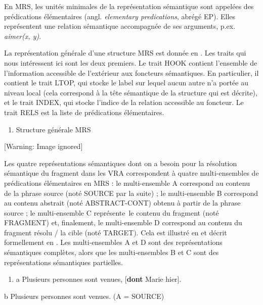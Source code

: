 En MRS, les unités minimales de la représentation sémantique sont appelées des prédications élémentaires (angl. \textit{elementary predications}, abrégé EP). Elles représentent une relation sémantique accompagnée de ses arguments, p.ex. \textit{aimer(x, y)}. 

La représentation générale d'une structure MRS est donnée en . Les traits qui nous intéressent ici sont les deux premiers. Le trait HOOK contient l'ensemble de l'information accessible de l'extérieur aux foncteurs sémantiques. En particulier, il contient le trait LTOP, qui stocke le label sur lequel aucun autre n'a portée au niveau local (cela correspond à la tête sémantique de la structure qui est décrite), et le trait INDEX, qui stocke l'indice de la relation accessible au foncteur. Le trait RELS est la liste de prédications élémentaires.


\begin{enumerate}
\item \label{bkm:Ref297843200}Structure générale MRS


\end{enumerate}
  [Warning: Image ignored] %
  

Les quatre représentations sémantiques dont on a besoin pour la résolution sémantique du fragment dans les VRA correspondent à quatre multi-ensembles de prédications élémentaires en MRS : le multi-ensemble A correspond au contenu de la phrase source (noté SOURCE par la suite) ; le multi-ensemble B correspond au contenu abstrait (noté ABSTRACT-CONT) obtenu à partir de la phrase source ; le multi-ensemble C représente~le contenu du fragment (noté FRAGMENT) et, finalement, le multi-ensemble D correspond au contenu du fragment résolu / la cible (noté TARGET). Cela est illustré en  et décrit formellement en . Les multi-ensembles A et D sont des représentations sémantiques complètes, alors que les multi-ensembles B et C sont des représentations sémantiques partielles. 


\begin{enumerate}
\item \label{bkm:Ref290580025}a  Plusieurs personnes sont venues, [\textbf{dont} Marie hier]. 


\end{enumerate}
  b  Plusieurs personnes sont venues. (A = SOURCE) 

